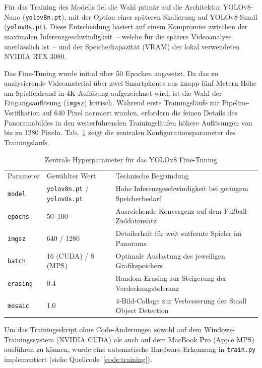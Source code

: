 Für das Training des Modells fiel die Wahl primär auf die Architektur YOLOv8-Nano (\texttt{yolov8n.pt}), 
mit der Option einer späteren Skalierung auf YOLOv8-Small (\texttt{yolov8s.pt}). Diese Entscheidung basiert 
auf einem Kompromiss zwischen der maximalen Inferenzgeschwindigkeit~-- welche für die spätere Videoanalyse
unerlässlich ist~-- und der Speicherkapazität (\ac{VRAM}) der lokal verwendeten NVIDIA RTX 3080.

Das Fine-Tuning wurde initial über 50 Epochen angesetzt. Da das zu analysierende Videomaterial über 
zwei Smartphones aus knapp fünf Metern Höhe am Spielfeldrand in 4K-Auflösung aufgezeichnet wird, ist 
die Wahl der Eingangsauflösung (\texttt{imgsz}) kritisch. Während erste Trainingsläufe zur 
Pipeline-Verifikation auf 640 Pixel normiert wurden, erfordern die feinen Details des 
Panoramabildes in den weiterführenden Trainingsläufen höhere Auflösungen von bis zu 1280 
Pixeln. Tab.~\ref{tab:hyperparameter} zeigt die zentralen Konfigurationsparameter des 
Trainingslaufs.

\begin{table}[htbp]
    \centering
    \caption{Zentrale Hyperparameter für das YOLOv8 Fine-Tuning}\label{tab:hyperparameter}
    \begin{tabularx}{\linewidth}{llX}
        \tabkopf{}
        Parameter & Gewählter Wert & Technische Begründung \\
        \texttt{model} & \texttt{yolov8n.pt} / \texttt{yolov8s.pt} & Hohe Inferenzgeschwindigkeit bei geringem Speicherbedarf \\
        \texttt{epochs} & 50--100 & Ausreichende Konvergenz auf dem Fußball-Zieldatensatz \\
        \texttt{imgsz} & 640 / 1280 & Detailerhalt für weit entfernte Spieler im Panorama \\
        \texttt{batch} & 16 (CUDA) / 8 (MPS) & Optimale Auslastung des jeweiligen Grafikspeichers \\
        \texttt{erasing} & 0.4 & Random Erasing zur Steigerung der Verdeckungstoleranz \\
        \texttt{mosaic} & 1.0 & 4-Bild-Collage zur Verbesserung der Small Object Detection \\
    \end{tabularx}
\end{table}

Um das Trainingsskript ohne Code-Änderungen sowohl auf dem Windows-Trainingssystem (NVIDIA CUDA) als 
auch auf dem MacBook Pro (Apple \ac{MPS}) ausführen zu können, wurde eine automatische Hardware-Erkennung 
in \texttt{train.py} implementiert (siehe Quellcode~\ref{code:training}).

